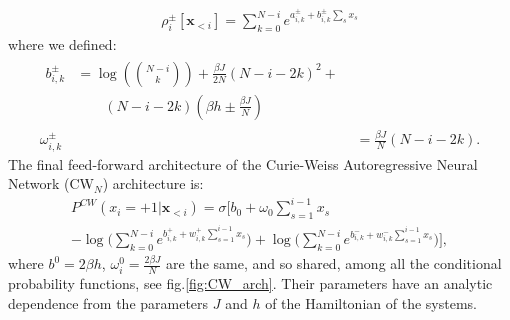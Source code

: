 \documentclass[aps,physrev,10pt,floatfix,reprint]{revtex4-2}
\begin{document}
 \begin{eqnarray*}
 \rho_i^{\pm}[\mathbf{x}_{<i}] = \sum_{k=0}^{N-i} e^{a_{i,k}^{\pm} + b_{i,k}^{\pm} \sum_s x_s} 
\end{eqnarray*}
where we defined:
\begin{align}
\label{eq:params}
\begin{split}
b_{i,k}^{\pm} & = \log\left(\binom{N-i}{k}\right) + \frac{\beta J}{2N}\left(N-i-2k\right)^{2}+ \\
& \qquad \left(N-i-2k\right)\left(\beta h \pm \frac{\beta J}{N}\right)
\end{split} \\
\omega_{i,k}^{\pm} & = \frac{\beta J}{N}\left(N-i-2k\right).
\label{eq:CW_params}
\end{align}
The final feed-forward architecture of the Curie-Weiss Autoregressive Neural Network (CW$_N$) architecture is:
\begin{multline*}
P^{CW}\left(x_{i}=+1|\mathbf{x}_{<i}\right)  =   \sigma \bigg[b_{0}+\omega_{0}\sum_{s=1}^{i-1}x_{s}\\
-\log\big(\sum_{k=0}^{N-i}e^{b_{i,k}^{+} + 
w_{i,k}^{+}\sum_{s=1}^{i-1}x_{s}}\big)+\log\big(\sum_{k=0}^{N-i}e^{b_{i,k}^{-} + w_{i,k}^{-}\sum_{s=1}^{i-1}x_{s}}\big)\bigg],
\end{multline*}
where $b^0=2\beta h$, $\omega^0_i = \frac{2\beta J}{N}$ are the same, and so shared, among all the conditional probability functions, see fig.\ref{fig:CW_arch}. Their parameters have an analytic dependence from the parameters $J$ and $h$ of the Hamiltonian of the systems. 
\end{document}
